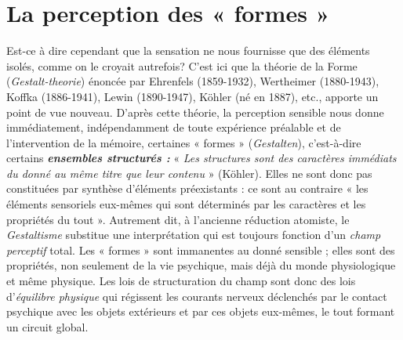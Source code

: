 \section{La perception des « formes »}%
Est-ce à dire cependant
que la sensation ne nous fournisse que des éléments isolés, comme on
le croyait autrefois? C’est ici que la théorie de la Forme ({\it Gestalt-theorie})
énoncée par Ehrenfels (1859-1932), Wertheimer (1880-1943),
Koffka (1886-1941), Lewin (1890-1947), Köhler (né en 1887),
etc., apporte un point de vue nouveau. D’après cette théorie, la perception
sensible nous donne immédiatement, indépendamment de toute
expérience préalable et de l'intervention de la mémoire, certaines
« formes » ({\it Gestalten}), c’est-à-dire certains \textbf{\textit {ensembles structurés :}}
« {\it Les structures sont des caractères immédiats du donné au même titre que
leur contenu} » (Köhler). Elles ne sont donc pas constituées par synthèse
d'éléments préexistants : ce sont au contraire « les éléments sensoriels
eux-mêmes qui sont déterminés par les caractères et les propriétés
du tout ». Autrement dit, à l’ancienne réduction atomiste, le {\it Gestaltisme}
substitue une interprétation qui est toujours fonction d’un
{\it champ perceptif} total. Les « formes » sont immanentes au donné sensible ;
elles sont des propriétés, non seulement de la vie psychique,
mais déjà du monde physiologique et même physique. Les lois de
structuration du champ sont donc des lois d'{\it équilibre physique} qui
régissent les courants nerveux déclenchés par le contact psychique
avec les objets extérieurs et par ces objets eux-mêmes, le tout formant
un circuit global.

